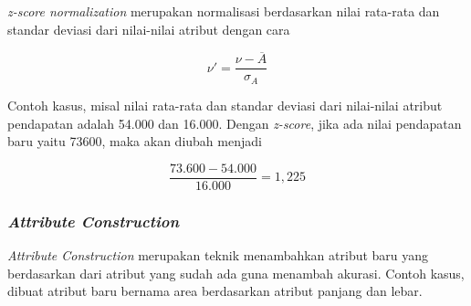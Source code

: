 \textsl{z-score normalization} merupakan normalisasi berdasarkan nilai rata-rata dan standar deviasi dari nilai-nilai atribut dengan cara

\begin{displaymath}
\nu' = \frac{\nu-\overline{A}}{\sigma_{A}}
\end{displaymath}

Contoh kasus, misal nilai rata-rata dan standar deviasi dari nilai-nilai atribut pendapatan adalah 54.000 dan 16.000. Dengan \textsl{z-score}, jika ada nilai pendapatan baru yaitu 73600, maka akan diubah menjadi

\begin{displaymath}
\frac{73.600-54.000}{16.000} = 1,225 
\end{displaymath}

\subsubsection{\textsl{Attribute Construction}}
\textsl{Attribute Construction} merupakan teknik menambahkan atribut baru yang berdasarkan dari atribut yang sudah ada guna menambah akurasi. Contoh kasus, dibuat atribut baru bernama area berdasarkan atribut panjang dan lebar. 


